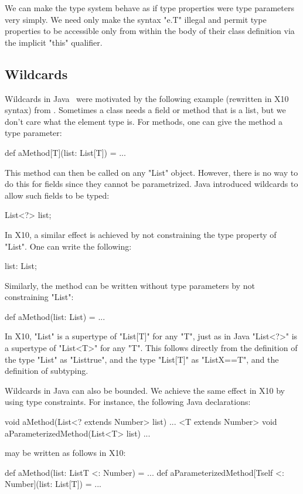 \documentclass[preprint,nocopyrightspace,9pt]{sigplanconf}
\begin{document}
We can make the type system behave as if type properties were
type parameters very simply.  We need only make the syntax \xcd"e.T"
illegal and permit type properties to be accessible only
from within the body of their class definition via the implicit \xcd"this"
qualifier.

\subsection{Wildcards}

Wildcards in Java~\cite{Java3,adding-wildcards} were motivated
by the following example (rewritten in X10 syntax)
from \cite{adding-wildcards}.
Sometimes a class needs a field or method
that is a list, but we don't care what the element type is.
For methods, one can give the method a type parameter:
\begin{xten}
def aMethod[T](list: List[T]) = { ... }
\end{xten}
This method can then be called on any \xcd"List" object.
However, there is no way to do this for fields since they
cannot be parametrized.
Java introduced wildcards to allow such fields to be
typed:
\begin{xten}
List<?> list;
\end{xten}
In X10, a similar effect is achieved by not constraining the
type property of \xcd"List".
One can write the following:
\begin{xten}
list: List;
\end{xten}
Similarly, the method can be written without type parameters by
not constraining \xcd"List":
\begin{xten}
def aMethod(list: List) = { ... }
\end{xten}

In X10, \xcd"List"
is a supertype of
\xcd"List[T]" for any \xcd"T",
just as in Java
\xcd"List<?>" is a supertype of
\xcd"List<T>" for any \xcd"T".
This follows directly from the definition of the type \xcd"List"
as \xcd"List{true}", and the type \xcd"List[T]"
as \xcd"List{X==T}", and the definition of subtyping.

Wildcards in Java can also be bounded.
We achieve the same
effect in X10 by using type constraints.
For instance, the following Java declarations:
\begin{xten}
void aMethod(List<? extends Number> list) { ... }
<T extends Number> void aParameterizedMethod(List<T> list) { ... }
\end{xten}
may be written as follows in X10:
\begin{xten}
def aMethod(list: List{T <: Number}) = { ... }
def aParameterizedMethod[T{self <: Number}](list: List[T]) = { ... }
\end{xten}
\end{document}
